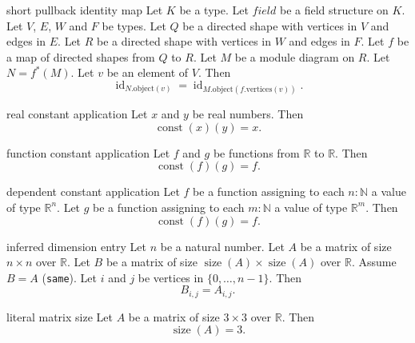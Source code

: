 \begin{cleanresult}{short pullback identity map}
Let $K$ be a type.
Let $\mathit{field}$ be a field structure on $K$.
Let $V$, $E$, $W$ and $F$ be types.
Let $Q$ be a directed shape with vertices in $V$ and edges in $E$.
Let $R$ be a directed shape with vertices in $W$ and edges in $F$.
Let $f$ be a map of directed shapes from $Q$ to $R$.
Let $M$ be a module diagram on $R$.
Let $N = f^{*}(M)$.
Let $v$ be an element of $V$.
Then \[\operatorname{id}_{N.\mathrm{object}(v)} = \operatorname{id}_{M.\mathrm{object}(f.\mathrm{vertices}(v))}.\]
\end{cleanresult}

\begin{cleanresult}{real constant application}
Let $x$ and $y$ be real numbers.
Then \[\operatorname{const}(x)(y) = x.\]
\end{cleanresult}

\begin{cleanresult}{function constant application}
Let $f$ and $g$ be functions from $\mathbb{R}$ to $\mathbb{R}$.
Then \[\operatorname{const}(f)(g) = f.\]
\end{cleanresult}

\begin{cleanresult}{dependent constant application}
Let $f$ be a function assigning to each $n : \mathbb{N}$ a value of type $\mathbb{R}^{n}$.
Let $g$ be a function assigning to each $m : \mathbb{N}$ a value of type $\mathbb{R}^{m}$.
Then \[\operatorname{const}(f)(g) = f.\]
\end{cleanresult}

\begin{cleanresult}{inferred dimension entry}
Let $n$ be a natural number.
Let $A$ be a matrix of size $n\times n$ over $\mathbb{R}$.
Let $B$ be a matrix of size $\operatorname{size}(A)\times \operatorname{size}(A)$ over $\mathbb{R}$.
Assume $B = A$ (\texttt{same}).
Let $i$ and $j$ be vertices in $\{0,\ldots,n-1\}$.
Then \[B_{i,j} = A_{i,j}.\]
\end{cleanresult}

\begin{cleanresult}{literal matrix size}
Let $A$ be a matrix of size $3\times 3$ over $\mathbb{R}$.
Then \[\operatorname{size}(A) = 3.\]
\end{cleanresult}

